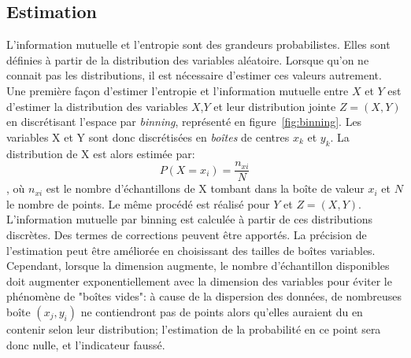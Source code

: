 
\subsection{Estimation}



L'information mutuelle et l'entropie sont des grandeurs probabilistes. Elles sont définies à partir de la distribution des variables aléatoire. Lorsque qu'on ne connait pas les distributions, il est nécessaire d'estimer ces valeurs autrement. 
Une première façon d'estimer l'entropie et l'information mutuelle entre $X$ et $Y$ est d'estimer la distribution des variables $X$,$Y$ et leur distribution jointe $Z = (X,Y)$ en discrétisant l'espace par \emph{binning}, représenté en figure~\ref{fig:binning}. Les variables X et Y sont donc discrétisées en \emph{boîtes} de centres $x_k$ et $y_k$. La distribution de X est alors estimée par: 
$$P(X = x_i) = \frac{n_{xi}}{N} $$, où $n_{xi}$ est le nombre d'échantillons de X tombant dans la boîte de valeur $x_i$ et $N$ le nombre de points. Le même procédé est réalisé pour $Y$ et $Z = (X,Y)$.
L'information mutuelle par binning est calculée à partir de ces distributions discrètes.
Des termes de corrections peuvent être apportés. La précision de l'estimation peut être améliorée en choisissant des tailles de boîtes variables. Cependant, lorsque la dimension augmente, le nombre d'échantillon disponibles doit augmenter exponentiellement avec la dimension des variables pour éviter le phénomène de "boîtes vides": à cause de la dispersion des données, de nombreuses boîte $(x_j,y_i)$ ne contiendront pas de points alors qu'elles auraient du en contenir selon leur distribution; l'estimation de la probabilité en ce point sera donc nulle, et l'indicateur faussé. 

